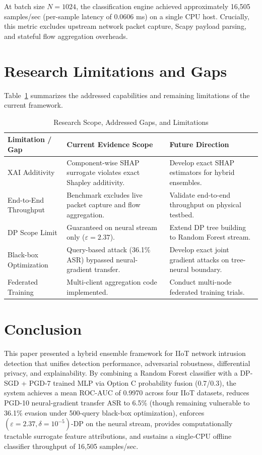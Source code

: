 \documentclass[10pt,journal,compsoc,twocolumn]{IEEEtran}
\begin{document}
At batch size $N=1024$, the classification engine achieved approximately 16,505 samples/sec (per-sample latency of 0.0606 ms) on a single CPU host. Crucially, this metric excludes upstream network packet capture, Scapy payload parsing, and stateful flow aggregation overheads.

\section{Research Limitations and Gaps}
Table~\ref{tab:limitations_matrix} summarizes the addressed capabilities and remaining limitations of the current framework.

\begin{table}[htbp]
\caption{Research Scope, Addressed Gaps, and Limitations}
\label{tab:limitations_matrix}
\centering
\begin{tabular}{p{2.2cm}p{2.5cm}p{2.5cm}}
\toprule
\textbf{Limitation / Gap} & \textbf{Current Evidence Scope} & \textbf{Future Direction} \\
\midrule
XAI Additivity & Component-wise SHAP surrogate violates exact Shapley additivity. & Develop exact SHAP estimators for hybrid ensembles. \\
End-to-End Throughput & Benchmark excludes live packet capture and flow aggregation. & Validate end-to-end throughput on physical testbed. \\
DP Scope Limit & Guaranteed on neural stream only ($\varepsilon=2.37$). & Extend DP tree building to Random Forest stream. \\
Black-box Optimization & Query-based attack (36.1\% ASR) bypassed neural-gradient transfer. & Develop exact joint gradient attacks on tree-neural boundary. \\
Federated Training & Multi-client aggregation code implemented. & Conduct multi-node federated training trials. \\
\bottomrule
\end{tabular}
\end{table}

\section{Conclusion}
This paper presented a hybrid ensemble framework for IIoT network intrusion detection that unifies detection performance, adversarial robustness, differential privacy, and explainability. By combining a Random Forest classifier with a DP-SGD + PGD-7 trained MLP via Option C probability fusion (0.7/0.3), the system achieves a mean ROC-AUC of 0.9970 across four IIoT datasets, reduces PGD-10 neural-gradient transfer ASR to 6.5\% (though remaining vulnerable to 36.1\% evasion under 500-query black-box optimization), enforces $(\varepsilon=2.37, \delta=10^{-5})$-DP on the neural stream, provides computationally tractable surrogate feature attributions, and sustains a single-CPU offline classifier throughput of 16,505 samples/sec.



\end{document}
